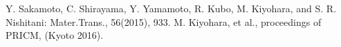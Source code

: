 \documentclass[12pt,a4paper,dvipdfmx]{jsarticle}
\begin{document}
{\small\setlength\baselineskip{10pt}	%
\begin{thebibliography}{9}
Y. Sakamoto, C. Shirayama, Y. Yamamoto, R. Kubo, M. Kiyohara, and S. R. Nishitani: Mater.Trans., 56(2015), 933.
 M. Kiyohara, et al., proceedings of PRICM, (Kyoto 2016).
\end{thebibliography}
}
\end{document}
